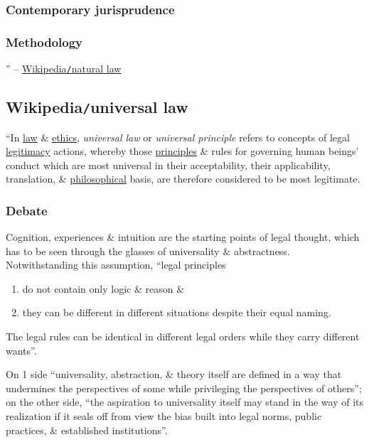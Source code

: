 \documentclass{article}
\begin{document}
\subsubsection{Contemporary jurisprudence}

\subsubsection{Methodology}

'' -- \href{https://en.wikipedia.org/wiki/Natural_law}{Wikipedia{\tt/}natural law}


\subsection{Wikipedia{\tt/}universal law}
``In \href{https://en.wikipedia.org/wiki/Law}{law} \& \href{https://en.wikipedia.org/wiki/Ethics}{ethics}, {\it universal law} or {\it universal principle} refers to concepts of legal \href{https://en.wikipedia.org/wiki/Legitimacy_(political)}{legitimacy} actions, whereby those \href{https://en.wikipedia.org/wiki/Value_(personal_and_cultural)}{principles} \& rules for governing human beings' conduct which are most universal in their acceptability, their applicability, translation, \& \href{https://en.wikipedia.org/wiki/Philosophical}{philosophical} basis, are therefore considered to be most legitimate.

\subsubsection{Debate}
Cognition, experiences \& intuition are the starting points of legal thought, which has to be seen through the glasses of universality \& abstractness. Notwithstanding this assumption, ``legal principles
\begin{enumerate}
	\item do not contain only logic \& reason \&
	\item they can be different in different situations despite their equal naming.
\end{enumerate}
The legal rules can be identical in different legal orders while they carry different wants''.

On 1 side ``universality, abstraction, \& theory itself are defined in a way that undermines the perspectives of some while privileging the perspectives of others''; on the other side, ``the aspiration to universality itself may stand in the way of its realization if it seals off from view the bias built into legal norms, public practices, \& established institutions''.
\end{document}

